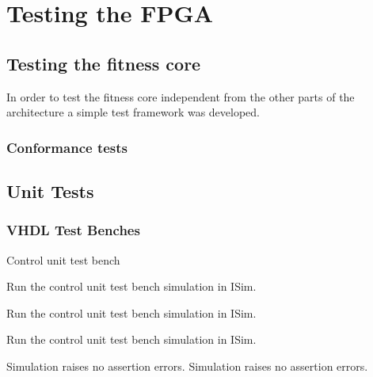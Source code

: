 \section{Testing the FPGA}


\subsection{Testing the fitness core}
In order to test the fitness core independent from the other parts of the architecture a simple test framework was developed. 



\subsubsection{Conformance tests}

























\subsection{Unit Tests}


\subsubsection{VHDL Test Benches}

\test
{Control unit test bench}{
    \item{Run the control unit test bench simulation in ISim.}
    \item{Run the control unit test bench simulation in ISim.}
    \item{Run the control unit test bench simulation in ISim.}
}{Simulation raises no assertion errors.}
{Simulation raises no assertion errors.}

